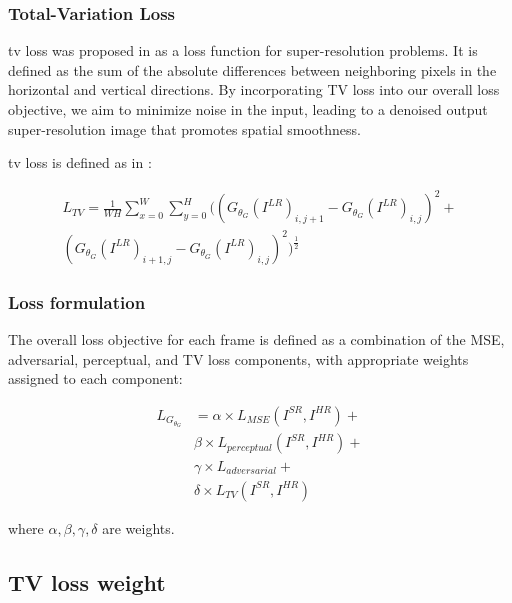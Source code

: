 \documentclass[conference]{IEEEtran}
\begin{document}
\subsubsection{Total-Variation Loss\label{sec:total_variation_loss}}

\acrshort{tv} loss was proposed in \cite{image_upsampling_total_variation_regularization_2005} as a loss function for super-resolution problems. It is defined as the sum of the absolute differences between neighboring pixels in the horizontal and vertical directions. By incorporating TV loss into our overall loss objective, we aim to minimize noise in the input, leading to a denoised output super-resolution image that promotes spatial smoothness.

\acrshort{tv} loss is defined as in \cite{deep_learning_image_sr_2020}:

\begin{gather*} \label{eq:tv_loss}
	L_{TV} = \frac{1}{WH} \sum_{x=0}^{W} \sum_{y=0}^{H}  ((G_{\theta_G} (I^{LR})_{i, j+1} - G_{\theta_G} (I^{LR})_{i, j})^2 + \\(G_{\theta_G} (I^{LR})_{i+1, j} - G_{\theta_G} (I^{LR})_{i, j})^2 )^{\frac{1}{2}}
\end{gather*}

\subsubsection{Loss formulation}

The overall loss objective for each frame is defined as a combination of the MSE, adversarial, perceptual, and TV loss components, with appropriate weights assigned to each component:

\begin{equation} \label{eq:total_Gloss}
	\begin{split}
		L_{G_{\theta_G}} &= \alpha \times L_{MSE}(I^{SR}, I^{HR}) + \\
		& \beta \times L_{perceptual} (I^{SR}, I^{HR}) + \\
		& \gamma \times L_{adversarial}  + \\
		& \delta \times L_{TV} (I^{SR}, I^{HR})
	\end{split}
\end{equation}

where $\alpha, \beta, \gamma, \delta$ are weights.

\subsection{TV loss weight}
\end{document}
